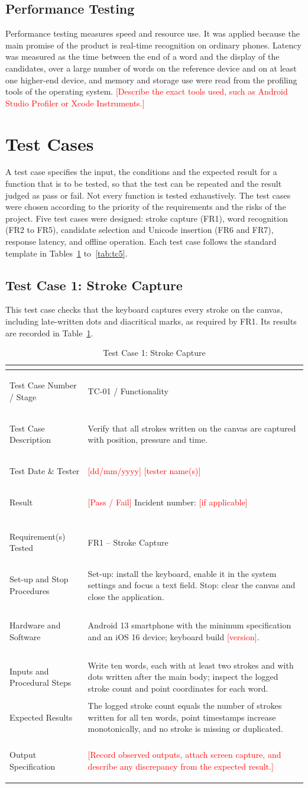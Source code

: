 \documentclass[12pt,a4paper]{report}
\newcommand{\todo}[1]{\textcolor{red}{[#1]}}
\newcommand{\testcase}[9]{%
\begin{longtable}{|>{\bfseries\raggedright}p{1.35in}|p{4.3in}|}
\caption{#1}\label{#2}\\
\hline
\endfirsthead
\hline
\endhead
\hline
\endfoot
\multicolumn{2}{|c|}{\cellcolor{gray!30}\textbf{GENERAL INFORMATION}}\\\hline
Test Case Number / Stage & #3\\\hline
Test Case Description & #4\\\hline
Test Date \& Tester & \todo{dd/mm/yyyy} \quad \todo{tester name(s)}\\\hline
Result & \todo{Pass / Fail} \quad Incident number: \todo{if applicable}\\\hline
\multicolumn{2}{|c|}{\cellcolor{gray!30}\textbf{INTRODUCTION}}\\\hline
Requirement(s) Tested & #5\\\hline
Set-up and Stop Procedures & #6\\\hline
\multicolumn{2}{|c|}{\cellcolor{gray!30}\textbf{ENVIRONMENTAL NEEDS}}\\\hline
Hardware and Software & #7\\\hline
\multicolumn{2}{|c|}{\cellcolor{gray!30}\textbf{TEST}}\\\hline
Inputs and Procedural Steps & #8\\\hline
Expected Results & #9\\\hline
\multicolumn{2}{|c|}{\cellcolor{gray!30}\textbf{ACTUAL RESULTS}}\\\hline
Output Specification & \todo{Record observed outputs, attach screen capture, and describe any discrepancy from the expected result.}\\
\end{longtable}}
\begin{document}
\subsection{Performance Testing}
Performance testing measures speed and resource use. It was applied because the main promise of the product is real-time recognition on ordinary phones. Latency was measured as the time between the end of a word and the display of the candidates, over a large number of words on the reference device and on at least one higher-end device, and memory and storage use were read from the profiling tools of the operating system. \todo{Describe the exact tools used, such as Android Studio Profiler or Xcode Instruments.}

\section{Test Cases}
A test case specifies the input, the conditions and the expected result for a function that is to be tested, so that the test can be repeated and the result judged as pass or fail. Not every function is tested exhaustively. The test cases were chosen according to the priority of the requirements and the risks of the project. Five test cases were designed: stroke capture (FR1), word recognition (FR2 to FR5), candidate selection and Unicode insertion (FR6 and FR7), response latency, and offline operation. Each test case follows the standard template in Tables~\ref{tab:tc1} to~\ref{tab:tc5}.

\subsection{Test Case 1: Stroke Capture}
This test case checks that the keyboard captures every stroke on the canvas, including late-written dots and diacritical marks, as required by FR1. Its results are recorded in Table~\ref{tab:tc1}.

\testcase{Test Case 1: Stroke Capture}{tab:tc1}%
{TC-01 / Functionality}%
{Verify that all strokes written on the canvas are captured with position, pressure and time.}%
{FR1 -- Stroke Capture}%
{Set-up: install the keyboard, enable it in the system settings and focus a text field. Stop: clear the canvas and close the application.}%
{Android 13 smartphone with the minimum specification and an iOS 16 device; keyboard build \todo{version}.}%
{Write ten words, each with at least two strokes and with dots written after the main body; inspect the logged stroke count and point coordinates for each word.}%
{The logged stroke count equals the number of strokes written for all ten words, point timestamps increase monotonically, and no stroke is missing or duplicated.}
\end{document}
